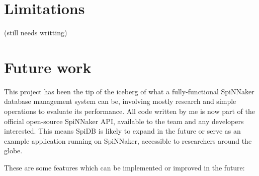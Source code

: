 \section{Limitations}

(still needs writting)

\section{Future work}
This project has been the tip of the iceberg of what a fully-functional SpiNNaker database management system can be, involving mostly research and simple operations to evaluate its performance. All code written by me is now part of the official open-source SpiNNaker API, available to the team and any developers interested. This means SpiDB is likely to expand in the future or serve as an example application running on SpiNNaker, accessible to researchers around the globe.

These are some features which can be implemented or improved in the future:

